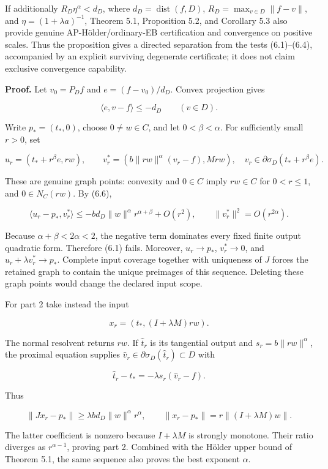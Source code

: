\documentclass[11pt,a4paper]{article}
\theoremstyle{plain}
\theoremstyle{definition}
\theoremstyle{remark}
\begin{document}
If additionally \(R_D\eta^\alpha<d_D\), where
\(d_D=\operatorname{dist}(f,D)\), \(R_D=\max_{v\in D}\|f-v\|\), and
\(\eta=(1+\lambda a)^{-1}\), Theorem 5.1, Proposition 5.2, and Corollary
5.3 also provide genuine AP-Hölder/ordinary-EB certification and
convergence on positive scales. Thus the proposition gives a directed
separation from the tests (6.1)--(6.4), accompanied by an explicit
surviving degenerate certificate; it does not claim exclusive
convergence capability.

\textbf{Proof.} Let \(v_0=P_Df\) and \(e=(f-v_0)/d_D\). Convex
projection gives

\[
\langle e,v-f\rangle\le-d_D\qquad(v\in D).
\tag{6.6}
\]

Write \(p_*=(t_*,0)\), choose \(0\ne w\in C\), and let
\(0<\beta<\alpha\). For sufficiently small \(r>0\), set

\[
u_r=(t_*+r^\beta e,rw),\qquad
v_r^*=(b\|rw\|^\alpha(v_r-f),Mrw),
\quad v_r\in\partial\sigma_D(t_*+r^\beta e).
\]

These are genuine graph points: convexity and \(0\in C\) imply
\(rw\in C\) for \(0<r\le1\), and \(0\in N_C(rw)\). By (6.6),

\[
\langle u_r-p_*,v_r^*\rangle
\le-bd_D\|w\|^\alpha r^{\alpha+\beta}+O(r^2),
\qquad
\|v_r^*\|^2=O(r^{2\alpha}).
\]

Because \(\alpha+\beta<2\alpha<2\), the negative term dominates every
fixed finite output quadratic form. Therefore (6.1) fails. Moreover,
\(u_r\to p_*\), \(v_r^*\to0\), and \(u_r+\lambda v_r^*\to p_*\).
Complete input coverage together with uniqueness of \(J\) forces the
retained graph to contain the unique preimages of this sequence.
Deleting these graph points would change the declared input scope.

For part 2 take instead the input

\[
x_r=(t_*,(I+\lambda M)rw).
\]

The normal resolvent returns \(rw\). If \(\widehat t_r\) is its
tangential output and \(s_r=b\|rw\|^\alpha\), the proximal equation
supplies \(\widehat v_r\in\partial\sigma_D(\widehat t_r)\subset D\) with

\[
\widehat t_r-t_*=-\lambda s_r(\widehat v_r-f).
\]

Thus

\[
\|Jx_r-p_*\|\ge\lambda bd_D\|w\|^\alpha r^\alpha,
\qquad
\|x_r-p_*\|=r\|(I+\lambda M)w\|.
\]

The latter coefficient is nonzero because \(I+\lambda M\) is strongly
monotone. Their ratio diverges as \(r^{\alpha-1}\), proving part 2.
Combined with the Hölder upper bound of Theorem 5.1, the same sequence
also proves the best exponent \(\alpha\).
\end{document}
